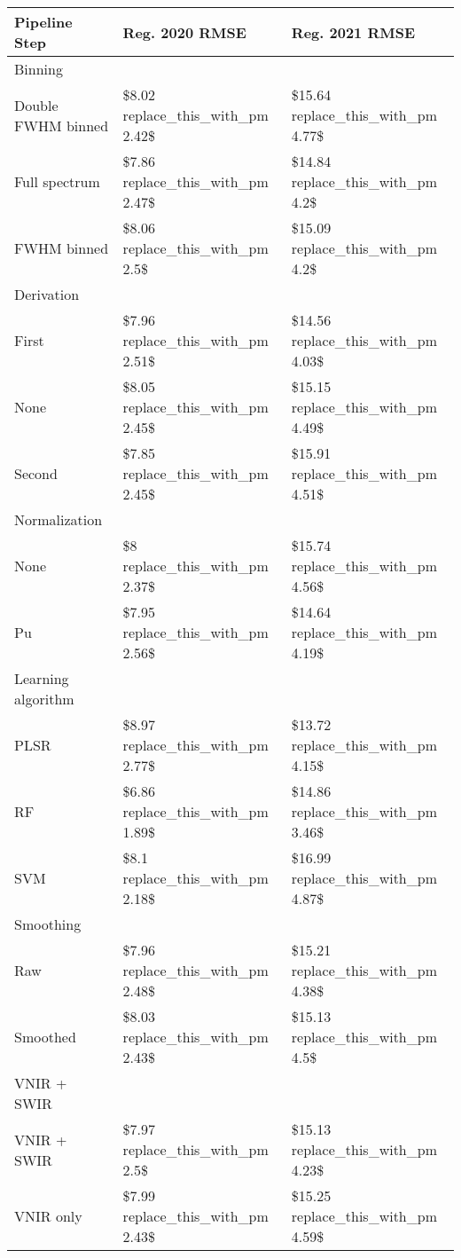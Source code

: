 \captionsetup[table]{labelformat=empty,skip=1pt}
\begin{longtable}{lll}
\toprule
Pipeline Step & Reg. 2020 RMSE & Reg. 2021 RMSE \\ 
\midrule
\multicolumn{1}{l}{Binning} \\ 
\midrule
Double FWHM binned & \$8.02 replace\_this\_with\_pm 2.42\$ & \$15.64 replace\_this\_with\_pm 4.77\$ \\ 
Full spectrum & \$7.86 replace\_this\_with\_pm 2.47\$ & \$14.84 replace\_this\_with\_pm 4.2\$ \\ 
FWHM binned & \$8.06 replace\_this\_with\_pm 2.5\$ & \$15.09 replace\_this\_with\_pm 4.2\$ \\ 
\midrule
\multicolumn{1}{l}{Derivation} \\ 
\midrule
First & \$7.96 replace\_this\_with\_pm 2.51\$ & \$14.56 replace\_this\_with\_pm 4.03\$ \\ 
None & \$8.05 replace\_this\_with\_pm 2.45\$ & \$15.15 replace\_this\_with\_pm 4.49\$ \\ 
Second & \$7.85 replace\_this\_with\_pm 2.45\$ & \$15.91 replace\_this\_with\_pm 4.51\$ \\ 
\midrule
\multicolumn{1}{l}{Normalization} \\ 
\midrule
None & \$8 replace\_this\_with\_pm 2.37\$ & \$15.74 replace\_this\_with\_pm 4.56\$ \\ 
Pu & \$7.95 replace\_this\_with\_pm 2.56\$ & \$14.64 replace\_this\_with\_pm 4.19\$ \\ 
\midrule
\multicolumn{1}{l}{Learning algorithm} \\ 
\midrule
PLSR & \$8.97 replace\_this\_with\_pm 2.77\$ & \$13.72 replace\_this\_with\_pm 4.15\$ \\ 
RF & \$6.86 replace\_this\_with\_pm 1.89\$ & \$14.86 replace\_this\_with\_pm 3.46\$ \\ 
SVM & \$8.1 replace\_this\_with\_pm 2.18\$ & \$16.99 replace\_this\_with\_pm 4.87\$ \\ 
\midrule
\multicolumn{1}{l}{Smoothing} \\ 
\midrule
Raw & \$7.96 replace\_this\_with\_pm 2.48\$ & \$15.21 replace\_this\_with\_pm 4.38\$ \\ 
Smoothed & \$8.03 replace\_this\_with\_pm 2.43\$ & \$15.13 replace\_this\_with\_pm 4.5\$ \\ 
\midrule
\multicolumn{1}{l}{VNIR + SWIR} \\ 
\midrule
VNIR + SWIR & \$7.97 replace\_this\_with\_pm 2.5\$ & \$15.13 replace\_this\_with\_pm 4.23\$ \\ 
VNIR only & \$7.99 replace\_this\_with\_pm 2.43\$ & \$15.25 replace\_this\_with\_pm 4.59\$ \\ 
\bottomrule
\end{longtable}

